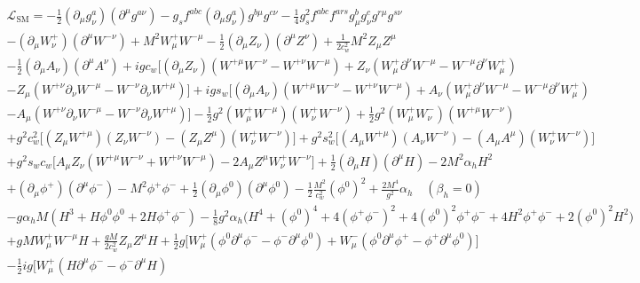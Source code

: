 \documentclass{article}
\begin{document}
\begin{multline*}
\mathcal{L}_{\mathrm{SM}} = 
-\frac{1}{2} (\partial_\mu g_\nu^a) (\partial^\mu g^{a\nu}) 
- g_s f^{abc} (\partial_\mu g_\nu^a) g^{b\mu} g^{c\nu} 
- \frac{1}{4} g_s^2 f^{abc} f^{ars} g_\mu^b g_\nu^c g^{r\mu} g^{s\nu} \\
- (\partial_\mu W_\nu^+) (\partial^\mu W^{-\nu}) 
+ M^2 W_\mu^+ W^{-\mu} 
- \frac{1}{2} (\partial_\mu Z_\nu) (\partial^\mu Z^\nu) 
+ \frac{1}{2c_w^2} M^2 Z_\mu Z^\mu \\
- \frac{1}{2} (\partial_\mu A_\nu) (\partial^\mu A^\nu) 
+ igc_w \Big[ (\partial_\mu Z_\nu) (W^{+\mu} W^{-\nu} - W^{+\nu} W^{-\mu}) 
+ Z_\nu (W_\mu^+ \partial^\nu W^{-\mu} - W^{-\mu} \partial^\nu W_\mu^+) \\
- Z_\mu (W^{+\nu} \partial_\nu W^{-\mu} - W^{-\nu} \partial_\nu W^{+\mu}) \Big] 
+ igs_w \Big[ (\partial_\mu A_\nu) (W^{+\mu} W^{-\nu} - W^{+\nu} W^{-\mu}) 
+ A_\nu (W_\mu^+ \partial^\nu W^{-\mu} - W^{-\mu} \partial^\nu W_\mu^+) \\
- A_\mu (W^{+\nu} \partial_\nu W^{-\mu} - W^{-\nu} \partial_\nu W^{+\mu}) \Big] 
- \frac{1}{2} g^2 (W_\mu^+ W^{-\mu}) (W_\nu^+ W^{-\nu}) 
+ \frac{1}{2} g^2 (W_\mu^+ W_\nu^-) (W^{+\mu} W^{-\nu}) \\
+ g^2 c_w^2 \Big[ (Z_\mu W^{+\mu}) (Z_\nu W^{-\nu}) - (Z_\mu Z^\mu) (W_\nu^+ W^{-\nu}) \Big] 
+ g^2 s_w^2 \Big[ (A_\mu W^{+\mu}) (A_\nu W^{-\nu}) - (A_\mu A^\mu) (W_\nu^+ W^{-\nu}) \Big] \\
+ g^2 s_w c_w \Big[ A_\mu Z_\nu (W^{+\mu} W^{-\nu} + W^{+\nu} W^{-\mu}) 
- 2 A_\mu Z^\mu W_\nu^+ W^{-\nu} \Big] 
+ \frac{1}{2} (\partial_\mu H) (\partial^\mu H) 
- 2 M^2 \alpha_h H^2 \\
+ (\partial_\mu \phi^+) (\partial^\mu \phi^-) 
- M^2 \phi^+ \phi^- 
+ \frac{1}{2} (\partial_\mu \phi^0) (\partial^\mu \phi^0) 
- \frac{1}{2} \frac{M^2}{c_w^2} (\phi^0)^2 
+ \frac{2M^4}{g^2} \alpha_h \quad (\beta_h=0) \\
- g \alpha_h M (H^3 + H \phi^0 \phi^0 + 2 H \phi^+ \phi^-) 
- \frac{1}{8} g^2 \alpha_h \Big( H^4 + (\phi^0)^4 + 4 (\phi^+ \phi^-)^2 + 4 (\phi^0)^2 \phi^+ \phi^- + 4 H^2 \phi^+ \phi^- + 2 (\phi^0)^2 H^2 \Big) \\
+ g M W_\mu^+ W^{-\mu} H 
+ \frac{g M}{2 c_w^2} Z_\mu Z^\mu H 
+ \frac{1}{2} g \Big[ W_\mu^+ (\phi^0 \partial^\mu \phi^- - \phi^- \partial^\mu \phi^0) 
+ W_\mu^- (\phi^0 \partial^\mu \phi^+ - \phi^+ \partial^\mu \phi^0) \Big] \\
- \frac{1}{2} i g \Big[ W_\mu^+ (H \partial^\mu \phi^- - \phi^- \partial^\mu H) 

\end{multline*}
\end{document}

